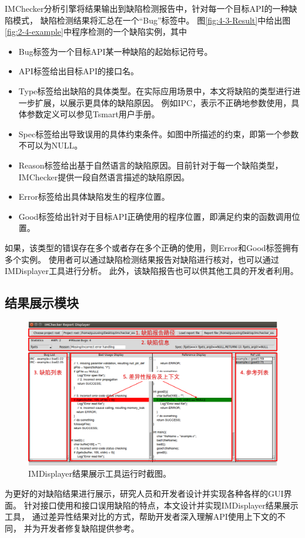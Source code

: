 IMChecker分析引擎将结果输出到缺陷检测报告中，针对每一个目标API的一种缺陷模式，
缺陷检测结果将汇总在一个“Bug”标签中。
图\ref{fig:4-3-Result}中给出图\ref{fig:2-4-example}中程序检测的一个缺陷实例，其中
\begin{itemize}
	\item Bug标签为一个目标API某一种缺陷的起始标记符号。
	\item API标签给出目标API的接口名。
	\item Type标签给出缺陷的具体类型。在实际应用场景中，本文将缺陷的类型进行进一步扩展，以展示更具体的缺陷原因。
	例如IPC，表示不正确地参数使用，具体参数定义可以参见Tsmart用户手册。
	\item Spec标签给出导致误用的具体约束条件。如图中所描述的约束，即第一个参数不可以为NULL。
	\item Reason标签给出基于自然语言的缺陷原因。目前针对于每一个缺陷类型，IMChecker提供一段自然语言描述的缺陷原因。
	\item Error标签给出具体缺陷发生的程序位置。
	\item Good标签给出针对于目标API正确使用的程序位置，即满足约束的函数调用位置。
\end{itemize}
如果，该类型的错误存在多个或者存在多个正确的使用，则Error和Good标签拥有多个实例。
使用者可以通过缺陷检测结果报告对缺陷进行核对，也可以通过IMDisplayer工具进行分析。
此外，该缺陷报告也可以供其他工具的开发者利用。


\subsection{结果展示模块}
\begin{figure}[t]
	\centering
	\includegraphics[width=0.85\linewidth]{figures/cp4-IMDisplayer.png}
	\caption{
		IMDisplayer结果展示工具运行时截图。
	}
	\label{fig:4-3-IMDisplayer}
\end{figure}

为更好的对缺陷结果进行展示，研究人员和开发者设计并实现各种各样的GUI界面。
针对接口使用和接口误用缺陷的特点，本文设计并实现IMDisplayer结果展示工具，
通过差异性结果对比的方式，帮助开发者深入理解API使用上下文的不同，
并为开发者修复缺陷提供参考。

